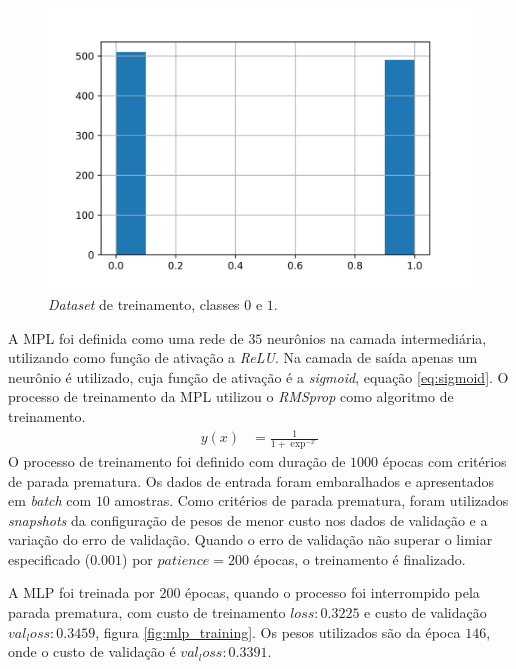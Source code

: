 \documentclass{article}
\begin{document}
    \begin{figure}[H]
        \centering
        \includegraphics[width=\linewidth]{mlp_out_scaled.png}   
        \caption{\textit{Dataset} de treinamento, classes $0$ e $1$.}
        \label{fig:out_data_scaled}
    \end{figure}
    A MPL foi definida como uma rede de $35$ neurônios na camada intermediária, utilizando
    como função de ativação a \textit{ReLU}. Na camada de saída apenas um neurônio é utilizado,
    cuja função de ativação é a \textit{sigmoid}, equação \ref{eq:sigmoid}.
    O processo de treinamento da MPL utilizou o \textit{RMSprop} como algoritmo de treinamento.
    \begin{align}
        y(x) &= \frac{1}{1 + \exp^{-x}}
        \label{eq:sigmoid}
    \end{align}
    O processo de treinamento foi definido com duração de $1000$ épocas com critérios de 
    parada prematura. Os dados de entrada foram embaralhados e apresentados
    em \textit{batch} com $10$ amostras.
    Como critérios de parada prematura, foram utilizados \textit{snapshots} da configuração de pesos
    de menor custo nos dados de validação e a variação do erro de validação.
    Quando o erro de validação não superar o limiar especificado ($0.001$) por $patience=200$ épocas,
    o treinamento é finalizado.
    
    A MLP foi treinada por $200$ épocas, quando o processo foi interrompido pela
    parada prematura, com custo de treinamento $loss: 0.3225$ e custo de validação
    $val_loss: 0.3459$, figura \ref{fig:mlp_training}. Os pesos utilizados são da época $146$, onde o custo de validação
    é $val_loss: 0.3391$.
\end{document}
